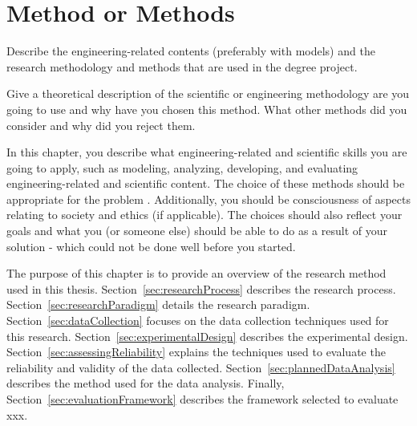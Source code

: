 \chapter{Method or Methods}
\label{ch:methods}


Describe the engineering-related contents (preferably with models) and the research methodology and methods that are used in the degree project.

Give a theoretical description of the scientific or engineering methodology are you going to use and why have you chosen this method. What other methods did you consider and why did you reject them.

In this chapter, you describe what engineering-related and scientific skills you are going to apply, such as modeling, analyzing, developing, and evaluating engineering-related and scientific content. The choice of these methods should be appropriate for the problem . Additionally, you should be consciousness of aspects relating to society and ethics (if applicable). The choices should also reflect your goals and what you (or someone else) should be able to do as a result of your solution - which could not be done well before you started.

The purpose of this chapter is to provide an overview of the research method
used in this thesis. Section~\ref{sec:researchProcess} describes the research
process. Section~\ref{sec:researchParadigm} details the research
paradigm. Section~\ref{sec:dataCollection} focuses on the data collection
techniques used for this research. Section~\ref{sec:experimentalDesign}
describes the experimental design. Section~\ref{sec:assessingReliability}
explains the techniques used to evaluate the reliability and validity of the
data collected. Section~\ref{sec:plannedDataAnalysis} describes the method
used for the data analysis. Finally, Section~\ref{sec:evaluationFramework}
describes the framework selected to evaluate xxx.

